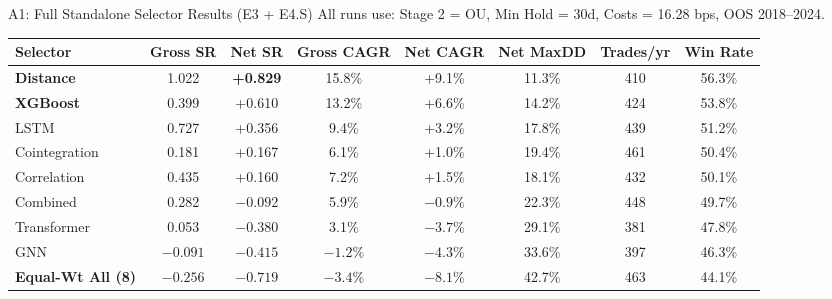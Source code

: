 \documentclass[aspectratio=169,10pt]{beamer}
\begin{document}
\begin{frame}{A1: Full Standalone Selector Results (E3 + E4.S)}
  \small All runs use: Stage 2 = OU, Min Hold = 30d, Costs = 16.28 bps, OOS 2018--2024.
  \vspace{4pt}
  \centering\scriptsize\renewcommand{\arraystretch}{1.35}
  \begin{tabular}{lccccccc}
    \toprule
    \textbf{Selector} & \textbf{Gross SR} & \textbf{Net SR} & \textbf{Gross CAGR} & \textbf{Net CAGR}
                      & \textbf{Net MaxDD} & \textbf{Trades/yr} & \textbf{Win Rate} \\
    \midrule
    \rowcolor{hlrow}\textbf{Distance}  & 1.022 & \color{goodgreen}\textbf{+0.829} & 15.8\% & +9.1\%  & 11.3\% & 410 & 56.3\% \\
    \textbf{XGBoost}   & 0.399 & \color{goodgreen}+0.610 & 13.2\% & +6.6\%  & 14.2\% & 424 & 53.8\% \\
    LSTM               & 0.727 & \color{goodgreen}+0.356 & 9.4\%  & +3.2\%  & 17.8\% & 439 & 51.2\% \\
    Cointegration      & 0.181 & \color{goodgreen}+0.167 & 6.1\%  & +1.0\%  & 19.4\% & 461 & 50.4\% \\
    Correlation        & 0.435 & \color{goodgreen}+0.160 & 7.2\%  & +1.5\%  & 18.1\% & 432 & 50.1\% \\
    Combined           & 0.282 & $-0.092$               & 5.9\%  & $-0.9\%$ & 22.3\% & 448 & 49.7\% \\
    Transformer        & 0.053 & $-0.380$               & 3.1\%  & $-3.7\%$ & 29.1\% & 381 & 47.8\% \\
    GNN                & $-0.091$ & \color{badred}$-0.415$ & $-1.2\%$ & $-4.3\%$ & 33.6\% & 397 & 46.3\% \\
    \midrule
    \textbf{Equal-Wt All (8)} & $-0.256$ & \color{badred}\textbf{$-0.719$}
                              & $-3.4\%$ & $-8.1\%$ & 42.7\% & 463 & 44.1\% \\
    \bottomrule
  \end{tabular}
\end{frame}
\end{document}
